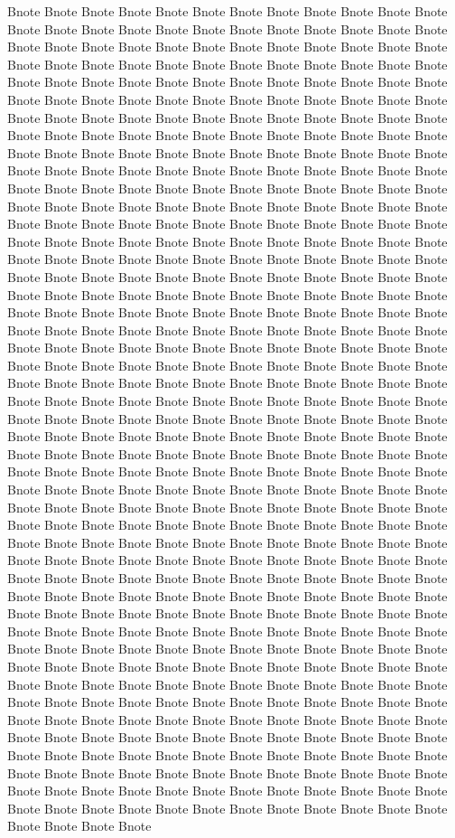 \documentclass[11pt,a4paper]{book}
\begin{document}
Bnote Bnote Bnote Bnote Bnote Bnote Bnote Bnote Bnote Bnote Bnote Bnote Bnote Bnote Bnote Bnote Bnote Bnote Bnote Bnote Bnote Bnote Bnote Bnote Bnote Bnote Bnote Bnote Bnote Bnote Bnote Bnote Bnote Bnote Bnote Bnote Bnote Bnote Bnote Bnote Bnote Bnote Bnote Bnote Bnote Bnote Bnote Bnote Bnote Bnote Bnote Bnote Bnote Bnote Bnote Bnote Bnote Bnote Bnote Bnote Bnote Bnote Bnote Bnote Bnote Bnote Bnote Bnote Bnote Bnote Bnote Bnote Bnote Bnote Bnote Bnote Bnote Bnote Bnote Bnote Bnote Bnote Bnote Bnote Bnote Bnote Bnote Bnote Bnote Bnote Bnote Bnote Bnote Bnote Bnote Bnote Bnote Bnote Bnote Bnote Bnote Bnote Bnote Bnote Bnote Bnote Bnote Bnote Bnote Bnote Bnote Bnote Bnote Bnote Bnote Bnote Bnote Bnote Bnote Bnote Bnote Bnote Bnote Bnote Bnote Bnote Bnote Bnote Bnote Bnote Bnote Bnote Bnote Bnote Bnote Bnote Bnote Bnote Bnote Bnote Bnote Bnote Bnote Bnote Bnote Bnote Bnote Bnote Bnote Bnote Bnote Bnote Bnote Bnote Bnote Bnote Bnote Bnote Bnote Bnote Bnote Bnote Bnote Bnote Bnote Bnote Bnote Bnote Bnote Bnote Bnote Bnote Bnote Bnote Bnote Bnote Bnote Bnote Bnote Bnote Bnote Bnote Bnote Bnote Bnote Bnote Bnote Bnote Bnote Bnote Bnote Bnote Bnote Bnote Bnote Bnote Bnote Bnote Bnote Bnote Bnote Bnote Bnote Bnote Bnote Bnote Bnote Bnote Bnote Bnote Bnote Bnote Bnote Bnote Bnote Bnote Bnote Bnote Bnote Bnote Bnote Bnote Bnote Bnote Bnote Bnote Bnote Bnote Bnote Bnote Bnote Bnote Bnote Bnote Bnote Bnote Bnote Bnote Bnote Bnote Bnote Bnote Bnote Bnote Bnote Bnote Bnote Bnote Bnote Bnote Bnote Bnote Bnote Bnote Bnote Bnote Bnote Bnote Bnote Bnote Bnote Bnote Bnote Bnote Bnote Bnote Bnote Bnote Bnote Bnote Bnote Bnote Bnote Bnote Bnote Bnote Bnote Bnote Bnote Bnote Bnote Bnote Bnote Bnote Bnote Bnote Bnote Bnote Bnote Bnote Bnote Bnote Bnote Bnote Bnote Bnote Bnote Bnote Bnote Bnote Bnote Bnote Bnote Bnote Bnote Bnote Bnote Bnote Bnote Bnote Bnote Bnote Bnote Bnote Bnote Bnote Bnote Bnote Bnote Bnote Bnote Bnote Bnote Bnote Bnote Bnote Bnote Bnote Bnote Bnote Bnote Bnote Bnote Bnote Bnote Bnote Bnote Bnote Bnote Bnote Bnote Bnote Bnote Bnote Bnote Bnote Bnote Bnote Bnote Bnote Bnote Bnote Bnote Bnote Bnote Bnote Bnote Bnote Bnote Bnote Bnote Bnote Bnote Bnote Bnote Bnote Bnote Bnote Bnote Bnote Bnote Bnote Bnote Bnote Bnote Bnote Bnote Bnote Bnote Bnote Bnote Bnote Bnote Bnote Bnote Bnote Bnote Bnote Bnote Bnote Bnote Bnote Bnote Bnote Bnote Bnote Bnote Bnote Bnote Bnote Bnote Bnote Bnote Bnote Bnote Bnote Bnote Bnote Bnote Bnote Bnote Bnote Bnote Bnote Bnote Bnote Bnote Bnote Bnote Bnote Bnote Bnote Bnote Bnote Bnote Bnote Bnote Bnote Bnote Bnote Bnote Bnote Bnote Bnote Bnote Bnote Bnote Bnote Bnote Bnote Bnote Bnote Bnote Bnote Bnote Bnote Bnote Bnote Bnote Bnote Bnote Bnote Bnote Bnote Bnote Bnote Bnote Bnote Bnote Bnote Bnote Bnote Bnote Bnote Bnote Bnote Bnote Bnote Bnote Bnote Bnote Bnote Bnote Bnote Bnote Bnote Bnote Bnote Bnote Bnote Bnote Bnote Bnote Bnote Bnote Bnote Bnote Bnote Bnote Bnote Bnote Bnote Bnote Bnote Bnote Bnote Bnote Bnote Bnote Bnote Bnote Bnote Bnote Bnote Bnote Bnote Bnote Bnote Bnote Bnote Bnote Bnote Bnote Bnote Bnote Bnote Bnote Bnote Bnote Bnote Bnote Bnote Bnote Bnote Bnote Bnote Bnote Bnote Bnote Bnote Bnote Bnote Bnote Bnote Bnote Bnote Bnote Bnote Bnote Bnote Bnote Bnote Bnote Bnote Bnote Bnote Bnote Bnote Bnote Bnote Bnote Bnote Bnote Bnote Bnote Bnote 
\end{document}
